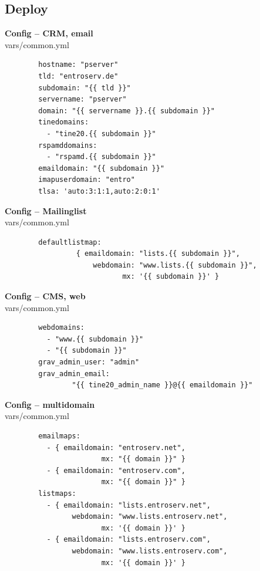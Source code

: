 \documentclass{beamer}
\begin{document}
\subsection{Deploy}
\begin{frame}[fragile]{\insertsection}{\insertsubsection}
	\vspace{-0.5cm}
	\textbf{Config -- CRM, email}\\
	vars/common.yml
    \begin{verbatim}
		hostname: "pserver"
		tld: "entroserv.de"
		subdomain: "{{ tld }}"
		servername: "pserver"
		domain: "{{ servername }}.{{ subdomain }}"
		tinedomains:
		  - "tine20.{{ subdomain }}"
		rspamddomains:
		  - "rspamd.{{ subdomain }}"
		emaildomain: "{{ subdomain }}"
		imapuserdomain: "entro"
		tlsa: 'auto:3:1:1,auto:2:0:1'
	\end{verbatim}
\end{frame}	

\begin{frame}[fragile]{\insertsection}{\insertsubsection}
	\vspace{-0.5cm}
	\textbf{Config -- Mailinglist}\\
	vars/common.yml
	\begin{verbatim}
		defaultlistmap:
		         { emaildomain: "lists.{{ subdomain }}",
		             webdomain: "www.lists.{{ subdomain }}",
		                    mx: '{{ subdomain }}' }
	\end{verbatim}
\end{frame}	

\begin{frame}[fragile]{\insertsection}{\insertsubsection}
	\vspace{-0.5cm}
	\textbf{Config -- CMS, web}\\
	vars/common.yml
	\begin{verbatim}
		webdomains: 
		  - "www.{{ subdomain }}"
		  - "{{ subdomain }}"
		grav_admin_user: "admin"
		grav_admin_email:
		        "{{ tine20_admin_name }}@{{ emaildomain }}"
	\end{verbatim}
\end{frame}	

\begin{frame}[fragile]{\insertsection}{\insertsubsection}
	\vspace{-0.5cm}
	\textbf{Config -- multidomain}\\
	vars/common.yml
	\begin{verbatim}
		emailmaps:
		  - { emaildomain: "entroserv.net",
		               mx: "{{ domain }}" }
		  - { emaildomain: "entroserv.com",
		               mx: "{{ domain }}" }
		listmaps:
		  - { emaildomain: "lists.entroserv.net",
		        webdomain: "www.lists.entroserv.net",
		               mx: '{{ domain }}' }
		  - { emaildomain: "lists.entroserv.com",
		        webdomain: "www.lists.entroserv.com",
		               mx: '{{ domain }}' }
	\end{verbatim}
\end{frame}	
\end{document}
